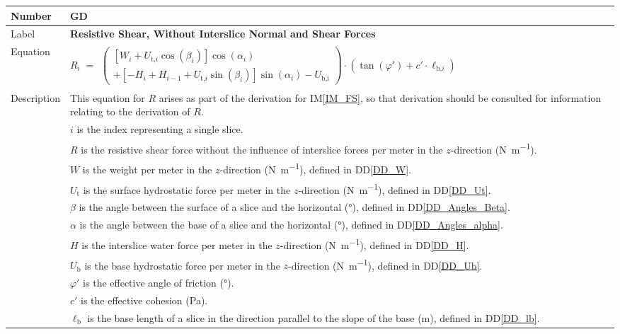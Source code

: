 \documentclass[12pt]{article}
\newcommand{\colAwidth}{0.13\textwidth}
\newcommand{\colBwidth}{0.82\textwidth}
\renewcommand{\arraystretch}{1}
\newcommand{\iref}[1]{IM\ref{#1}}
\newcommand{\ddref}[1]{DD\ref{#1}}
\newcounter{defnum} %
\begin{document}
\noindent
\begin{minipage}{\textwidth}
	\renewcommand*{\arraystretch}{1.5}
	\begin{tabular}{| p{\colAwidth} | p{\colBwidth} |}
		
		\hline \rowcolor[gray]{0.9} Number&
		GD{defnum}\thedefnum \label{GD_R}\\
		
		\hline Label& \bf Resistive Shear, Without Interslice Normal and Shear 
		Forces \\
		
		\hline
		Equation & 
		$R_i \; = \begin{array}{l}
		\left( \begin{array}{l}
		\left[ W_{i} + U_{\text{t,}i}
		\cos\left(\beta_{i}\right) \right]
		\cos\left(\alpha_{i}\right) \\
		+ \left[ - H_{i} + H_{i-1} +
		U_{\text{t,}i} \sin\left(\beta_{i}\right) \right]
		\sin\left(\alpha_{i}\right) - U_{\text{b,i}} \end{array}
		\right) \cdot \left(\tan\left(\varphi'\right)
		+ c' \cdot \ell_{\text{b,}i} \right) \end{array}$\\
		
		\hline Description &This equation for $R$ arises as part of the 
		derivation for \iref{IM_FS}, so that derivation should be consulted for 
		information relating to the derivation of $R$.\\
		&$i$ is the index representing a single slice.\\
		&$R$ is the resistive shear force without the influence of interslice 
		forces
		per meter in the $z$-direction (\si{\newton\per\meter}).\\
		&$W$ is the weight per meter in the $z$-direction 
		(\si{\newton\per\meter}), defined in \ddref{DD_W}.\\
		&${U_{\text{t}}}$ is the surface hydrostatic force 
		per meter in the $z$-direction (\si{\newton\per\meter}), defined in 
		\ddref{DD_Ut}.\\
		&$\beta{}$ is the angle between the surface of a slice and the 
		horizontal (\si{\degree}), defined in \ddref{DD_Angles_Beta}.\\
		&$\alpha{}$ is the angle between the base of a slice and the 
		horizontal (\si{\degree}), defined in \ddref{DD_Angles_alpha}.\\
		&$H$ is the interslice water force per meter in the $z$-direction 
		(\si{\newton\per\meter}), defined in 
		\ddref{DD_H}.\\
		&${U_{\text{b}}}$ is the base hydrostatic force 
		per meter in the $z$-direction (\si{\newton\per\meter}), defined in 
		\ddref{DD_Ub}.\\
		&$\varphi{}'$ is the effective angle of friction (\si{\degree}).\\
		&$c'$ is the effective cohesion (Pa).\\
		&$\ell_\text{b}$ is the base length of a slice in the direction 
		parallel to the slope of the base (\si{\meter}), defined in 
		\ddref{DD_lb}.\\
		

\end{tabular}
\end{minipage}
\end{document}
